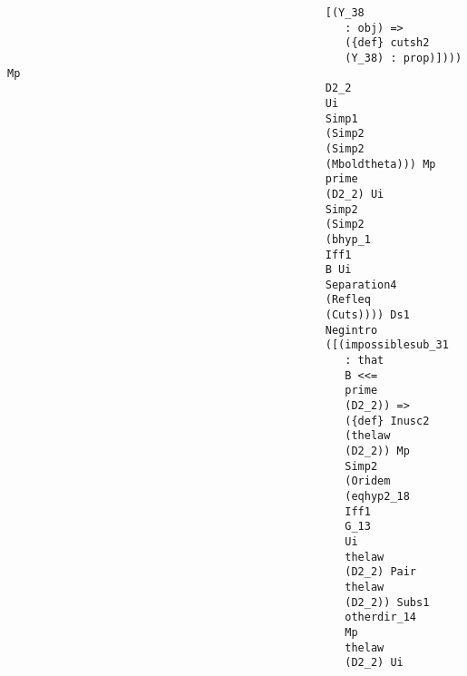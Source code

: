\documentclass[12pt]{article}
\begin{document}
\begin{verbatim}
                                                 [(Y_38 
                                                    : obj) => 
                                                    ({def} cutsh2 
                                                    (Y_38) : prop)]))) Mp 
                                                 D2_2 
                                                 Ui 
                                                 Simp1 
                                                 (Simp2 
                                                 (Simp2 
                                                 (Mboldtheta))) Mp 
                                                 prime 
                                                 (D2_2) Ui 
                                                 Simp2 
                                                 (Simp2 
                                                 (bhyp_1 
                                                 Iff1 
                                                 B Ui 
                                                 Separation4 
                                                 (Refleq 
                                                 (Cuts)))) Ds1 
                                                 Negintro 
                                                 ([(impossiblesub_31 
                                                    : that 
                                                    B <<= 
                                                    prime 
                                                    (D2_2)) => 
                                                    ({def} Inusc2 
                                                    (thelaw 
                                                    (D2_2)) Mp 
                                                    Simp2 
                                                    (Oridem 
                                                    (eqhyp2_18 
                                                    Iff1 
                                                    G_13 
                                                    Ui 
                                                    thelaw 
                                                    (D2_2) Pair 
                                                    thelaw 
                                                    (D2_2)) Subs1 
                                                    otherdir_14 
                                                    Mp 
                                                    thelaw 
                                                    (D2_2) Ui 

\end{verbatim}
\end{document}
